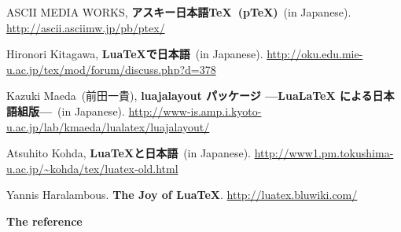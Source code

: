 \documentclass{ajt}
\begin{document}
\providecommand{\bysame}{\leavevmode\hbox to3em{\hrulefill}\thinspace}
\providecommand{\href}[2]{#2}
\begin{thebibliography}{9}


ASCII MEDIA WORKS, \textbf{アスキー日本語\TeX\ (p\TeX)}\ (in Japanese). \url{http://ascii.asciimw.jp/pb/ptex/}


Hironori Kitagawa, \textbf{LuaTeXで日本語}\ (in Japanese). \url{http://oku.edu.mie-u.ac.jp/tex/mod/forum/discuss.php?d=378}

Kazuki Maeda\ (前田一貴), \textbf{luajalayout パッケージ —LuaLaTeX による日本語組版—}\ (in Japanese).
\url{http://www-is.amp.i.kyoto-u.ac.jp/lab/kmaeda/lualatex/luajalayout/}

Atsuhito Kohda, \textbf{LuaTeXと日本語}\ (in Japanese). \url{http://www1.pm.tokushima-u.ac.jp/~kohda/tex/luatex-old.html}

Yannis Haralambous. \textbf{The Joy of LuaTeX}. \url{http://luatex.bluwiki.com/}

\textbf{The \LuaTeX reference}

\end{thebibliography}
\end{document}
